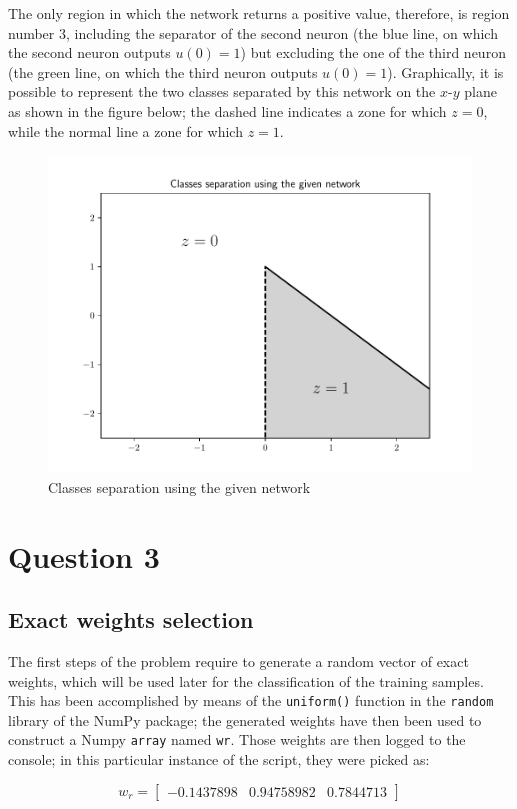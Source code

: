 \documentclass[letterpaper,headings=standardclasses]{scrartcl}
\begin{document}
The only region in which the network returns a positive value, therefore, is region number 3, including the separator of the second neuron (the blue line, on which the second neuron outputs $u(0) = 1$) but excluding the one of the third neuron (the green line, on which the third neuron outputs $u(0) = 1$). Graphically, it is possible to represent the two classes separated by this network on the $x$-$y$ plane as shown in the figure below; the dashed line indicates a zone for which $z = 0$, while the normal line a zone for which $z = 1$.

\begin{figure}[h]
\centering
\includegraphics[width=0.7\linewidth]{net_sep.pdf}
\caption{Classes separation using the given network}
\end{figure}

\section{Question 3}

\subsection{Exact weights selection}

The first steps of the problem require to generate a random vector of exact weights, which will be used later for the classification of the training samples. This has been accomplished by means of the \texttt{uniform()} function in the \texttt{random} library of the NumPy package; the generated weights have then been used to construct a Numpy \texttt{array} named \texttt{wr}. Those weights are then logged to the console; in this particular instance of the script, they were picked as:

$$ w_r = [\begin{matrix} -0.1437898 & 0.94758982 & 0.7844713 \end{matrix}] $$
\end{document}
